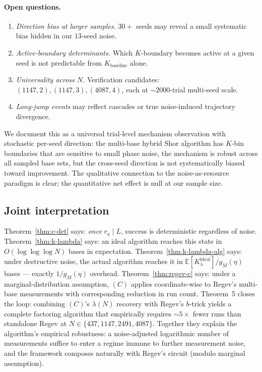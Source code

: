 \documentclass[11pt]{article}
\begin{document}
\paragraph{Open questions.}
\begin{enumerate}
  \item \emph{Direction bias at larger samples.} $30+$ seeds may reveal a small systematic bias hidden in our $13$-seed noise.
  \item \emph{Active-boundary determinants.} Which $K$-boundary becomes active at a given seed is not predictable from $K_{\text{baseline}}$ alone.
  \item \emph{Universality across $N$.} Verification candidates: $(1147, 2), (1147, 3), (4087, 4)$, each at $\sim 2000$-trial multi-seed scale.
  \item \emph{Long-jump events} may reflect cascades or true noise-induced trajectory divergence.
\end{enumerate}

We document this as a universal trial-level mechanism observation with stochastic per-seed direction: the multi-base hybrid Shor algorithm has $K$-bin boundaries that are sensitive to small phase noise, the mechanism is robust across all sampled base sets, but the cross-seed direction is not systematically biased toward improvement. The qualitative connection to the noise-as-resource paradigm is clear; the quantitative net effect is null at our sample size.

\subsection{Joint interpretation}

Theorem~\ref{thm:c-det} says: \emph{once} $r_a \mid L$, success is deterministic regardless of noise. Theorem~\ref{thm:k-lambda} says: an ideal algorithm reaches this state in $O(\log \log \log N)$ bases in expectation. Theorem~\ref{thm:k-lambda-alg} says: under destructive noise, the actual algorithm reaches it in $\mathbb{E}[K_\lambda^{\text{ideal}}] / g_M(\eta)$ bases --- exactly $1/g_M(\eta)$ overhead. Theorem~\ref{thm:regev-c} says: under a marginal-distribution assumption, $(C)$ applies coordinate-wise to Regev's multi-base measurements with corresponding reduction in run count. Theorem~5 closes the loop: combining $(C)$'s $\lambda(N)$ recovery with Regev's $b$-trick yields a complete factoring algorithm that empirically requires $\sim 5\times$ fewer runs than standalone Regev at $N \in \{437, 1147, 2491, 4087\}$. Together they explain the algorithm's empirical robustness: a noise-adjusted logarithmic number of measurements suffice to enter a regime immune to further measurement noise, and the framework composes naturally with Regev's circuit (modulo marginal assumption).
\end{document}
